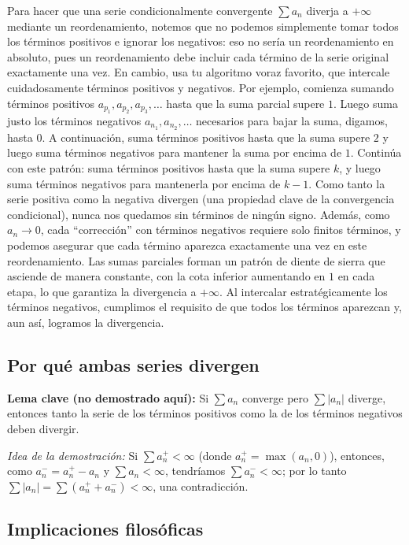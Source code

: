 Para hacer que una serie condicionalmente convergente $\sum a_n$ diverja a $+\infty$ mediante un reordenamiento, notemos que no podemos simplemente tomar todos los términos positivos e ignorar los negativos: eso no sería un reordenamiento en absoluto, pues un reordenamiento debe incluir cada término de la serie original exactamente una vez. En cambio, usa tu algoritmo voraz favorito, que intercale cuidadosamente términos positivos y negativos. Por ejemplo, comienza sumando términos positivos $a_{p_1}, a_{p_2}, a_{p_3}, \dots$ hasta que la suma parcial supere $1$. Luego suma justo los términos negativos $a_{n_1}, a_{n_2}, \dots$ necesarios para bajar la suma, digamos, hasta $0$. A continuación, suma términos positivos hasta que la suma supere $2$ y luego suma términos negativos para mantener la suma por encima de $1$. Continúa con este patrón: suma términos positivos hasta que la suma supere $k$, y luego suma términos negativos para mantenerla por encima de $k-1$. Como tanto la serie positiva como la negativa divergen (una propiedad clave de la convergencia condicional), nunca nos quedamos sin términos de ningún signo. Además, como $a_n \to 0$, cada ``corrección'' con términos negativos requiere solo finitos términos, y podemos asegurar que cada término aparezca exactamente una vez en este reordenamiento. Las sumas parciales forman un patrón de diente de sierra que asciende de manera constante, con la cota inferior aumentando en $1$ en cada etapa, lo que garantiza la divergencia a $+\infty$. Al intercalar estratégicamente los términos negativos, cumplimos el requisito de que todos los términos aparezcan y, aun así, logramos la divergencia.

\subsection{Por qué ambas series divergen}

\textbf{Lema clave (no demostrado aquí):} Si $\sum a_n$ converge pero $\sum |a_n|$ diverge, entonces tanto la serie de los términos positivos como la de los términos negativos deben divergir.

\emph{Idea de la demostración:} Si $\sum a_n^+ < \infty$ (donde $a_n^+ = \max(a_n, 0)$), entonces, como $a_n^- = a_n^+ - a_n$ y $\sum a_n < \infty$, tendríamos $\sum a_n^- < \infty$; por lo tanto $\sum |a_n| = \sum (a_n^+ + a_n^-) < \infty$, una contradicción.

\subsection{Implicaciones filosóficas}

